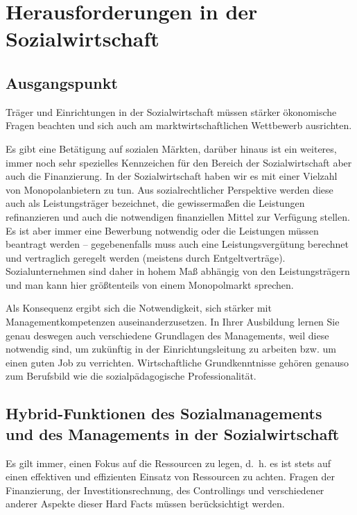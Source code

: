 \documentclass[
  letterpaper,
]{book}
\begin{document}
\section{Herausforderungen in der
Sozialwirtschaft}\label{herausforderungen-sozialwirtschaft}

\subsection{Ausgangspunkt}\label{sozialwirtschaft-ausgangspunkt}

Träger und Einrichtungen in der Sozialwirtschaft müssen stärker
ökonomische Fragen beachten und sich auch am marktwirtschaftlichen
Wettbewerb ausrichten.

Es gibt eine Betätigung auf sozialen Märkten, darüber hinaus ist ein
weiteres, immer noch sehr spezielles Kennzeichen für den Bereich der
Sozialwirtschaft aber auch die Finanzierung. In der Sozialwirtschaft
haben wir es mit einer Vielzahl von Monopolanbietern zu tun. Aus
sozialrechtlicher Perspektive werden diese auch als Leistungsträger
bezeichnet, die gewissermaßen die Leistungen refinanzieren und auch die
notwendigen finanziellen Mittel zur Verfügung stellen. Es ist aber immer
eine Bewerbung notwendig oder die Leistungen müssen beantragt werden --
gegebenenfalls muss auch eine Leistungsvergütung berechnet und
vertraglich geregelt werden (meistens durch Entgeltverträge).
Sozialunternehmen sind daher in hohem Maß abhängig von den
Leistungsträgern und man kann hier größtenteils von einem Monopolmarkt
sprechen.

Als Konsequenz ergibt sich die Notwendigkeit, sich stärker mit
Managementkompetenzen auseinanderzusetzen. In Ihrer Ausbildung lernen
Sie genau deswegen auch verschiedene Grundlagen des Managements, weil
diese notwendig sind, um zukünftig in der Einrichtungsleitung zu
arbeiten bzw. um einen guten Job zu verrichten. Wirtschaftliche
Grundkenntnisse gehören genauso zum Berufsbild wie die
sozialpädagogische Professionalität.

\subsection{Hybrid-Funktionen des Sozialmanagements und des Managements
in der Sozialwirtschaft}\label{sozialwirtschat-hybriditaet}

Es gilt immer, einen Fokus auf die Ressourcen zu legen, d.~h. es ist
stets auf einen effektiven und effizienten Einsatz von Ressourcen zu
achten. Fragen der Finanzierung, der Investitionsrechnung, des
Controllings und verschiedener anderer Aspekte dieser Hard Facts müssen
berücksichtigt werden.
\end{document}
